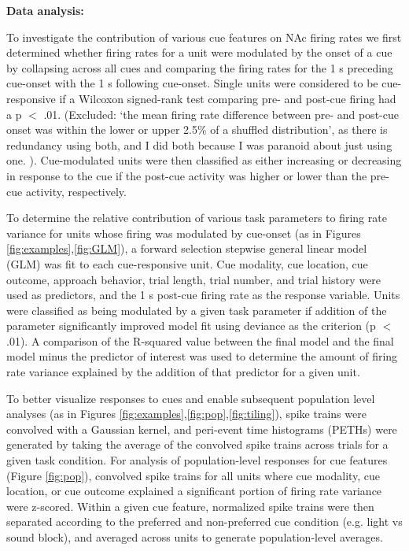 \documentclass[11pt]{article}
\begin{document}
{\bf Data analysis:}

To investigate the contribution of various cue features on NAc firing rates we first determined whether firing rates for a unit were modulated by the onset of a cue by collapsing across all cues and comparing the firing rates for the 1 s preceding cue-onset with the 1 s following cue-onset. Single units were considered to be cue-responsive if a Wilcoxon signed-rank test comparing pre- and post-cue firing had a p $<$ .01. (Excluded: ‘the mean firing rate difference between pre- and post-cue onset was within the lower or upper 2.5\% of a shuffled distribution’, as there is redundancy using both, and I did both because I was paranoid about just using one. ). Cue-modulated units were then classified as either increasing or decreasing in response to the cue if the post-cue activity was higher or lower than the pre-cue activity, respectively. 

To determine the relative contribution of various task parameters to firing rate variance for units whose firing was modulated by cue-onset (as in Figures \ref{fig:examples},\ref{fig:GLM}), a forward selection stepwise general linear model (GLM) was fit to each cue-responsive unit. Cue modality, cue location, cue outcome, approach behavior, trial length, trial number, and trial history were used as predictors, and the 1 s post-cue firing rate as the response variable. Units were classified as being modulated by a given task parameter if addition of the parameter significantly improved model fit using deviance as the criterion (p $<$ .01). A comparison of the R-squared value between the final model and the final model minus the predictor of interest was used to determine the amount of firing rate variance explained by the addition of that predictor for a given unit. 

To better visualize responses to cues and enable subsequent population level analyses (as in Figures \ref{fig:examples},\ref{fig:pop},\ref{fig:tiling}), spike trains were convolved with a Gaussian kernel, and peri-event time histograms (PETHs) were generated by taking the average of the convolved spike trains across trials for a given task condition. For analysis of population-level responses for cue features (Figure \ref{fig:pop}), convolved spike trains for all units where cue modality, cue location, or cue outcome explained a significant portion of firing rate variance were z-scored. Within a given cue feature, normalized spike trains were then separated according to the preferred and non-preferred cue condition (e.g. light vs sound block), and averaged across units to generate population-level averages.
\end{document}
